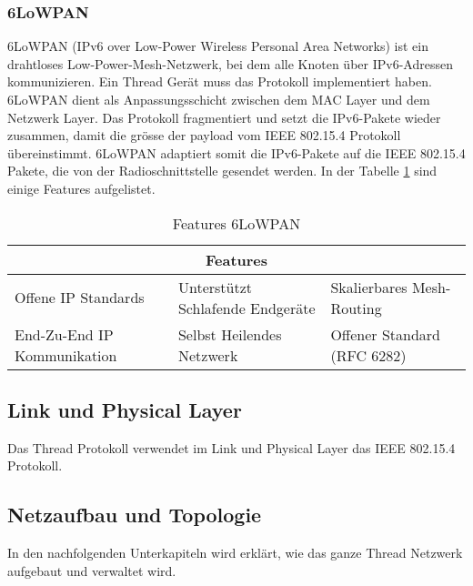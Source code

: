 \subsubsection{6LoWPAN}\label{subsubsec:6LoWPAN}
6LoWPAN (IPv6 over Low-Power Wireless Personal Area Networks) ist ein drahtloses Low-Power-Mesh-Netzwerk, bei dem alle Knoten über IPv6-Adressen kommunizieren. Ein Thread Gerät muss das Protokoll implementiert haben. 6LoWPAN dient als Anpassungsschicht zwischen dem MAC Layer und dem Netzwerk Layer. Das Protokoll fragmentiert und setzt die IPv6-Pakete wieder zusammen, damit die grösse der payload vom IEEE 802.15.4 Protokoll übereinstimmt. 6LoWPAN adaptiert somit die IPv6-Pakete auf die IEEE 802.15.4 Pakete, die von der Radioschnittstelle gesendet werden. \cite{thubert_compression_2011} In der Tabelle \ref{table:Features6LoWPAN} sind einige Features aufgelistet. \cite[Seite 3-10]{thread_group_inc_thread_2017}
\begin{table}[H]
	\centering
	\begin{adjustbox}{width=1\textwidth}
		\begin{tabular}{@{}|l|l|l|@{}}
			\toprule
			\multicolumn{3}{|c|}{\textbf{Features}}                                                      \\ \midrule
			Offene IP Standards         & Unterstützt Schlafende Endgeräte & Skalierbares Mesh-Routing   \\ \midrule
			End-Zu-End IP Kommunikation & Selbst Heilendes Netzwerk        & Offener Standard (RFC 6282) \\ \bottomrule
		\end{tabular}
	\end{adjustbox}
	\caption{Features 6LoWPAN}
	\label{table:Features6LoWPAN}
\end{table}

\subsection{Link und Physical Layer}\label{subsec:IEE802154}
Das Thread Protokoll verwendet im Link und Physical Layer das IEEE 802.15.4 Protokoll. \cite{ieee_computer_society_ieee_2020} \cite[Seite 3-2]{thread_group_inc_thread_2017}
\newpage

\subsection{Netzaufbau und Topologie}\label{subsec:NetzaufbauTopologie}
In den nachfolgenden Unterkapiteln wird erklärt, wie das ganze Thread Netzwerk aufgebaut und verwaltet wird.

